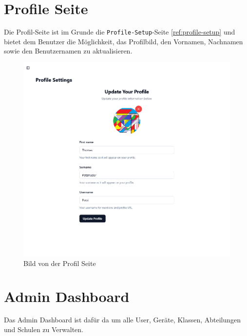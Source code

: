 \begin{inhalt}
\begin{enumerate}[label=\textbf{\arabic*.}]
\newpage

\section{Profile Seite}
\label{ref:profil-site}

Die Profil-Seite ist im Grunde die \texttt{Profile-Setup}-Seite \ref{ref:profile-setup} und bietet dem Benutzer die Möglichkeit, das Profilbild, den Vornamen, Nachnamen sowie den Benutzernamen zu aktualisieren.



\begin{figure}[!htb]
\centering
\includegraphics[width=1\textwidth]{files/Thomas/pics/Website/Profile/profile-screen.png}
\caption[Bild von der Profil Seite]{Bild von der Profil Seite}
\label{fig:gehaeuse_internet_bild}
\end{figure}

\newpage

\section{Admin Dashboard}

Das Admin Dashboard ist dafür da um alle User, Geräte, Klassen, Abteilungen und Schulen zu Verwalten. 


\end{enumerate}
\end{inhalt}
